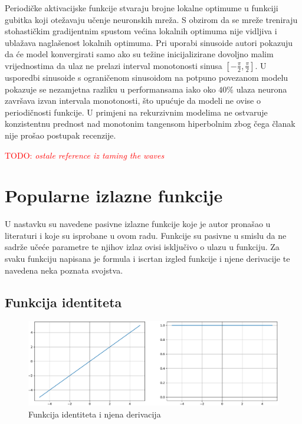 \documentclass[times, utf8, numeric, diplomski]{fer}
\def\TODO#1{\noindent\textcolor{red}{TODO: \textit{#1}}\newline}
\def\todo#1{\TODO{#1}}
\begin{document}
Periodičke aktivacijske funkcije stvaraju brojne lokalne optimume u funkciji gubitka koji otežavaju učenje neuronskih mreža. S obzirom da se mreže treniraju stohastičkim gradijentnim spustom većina lokalnih optimuma nije vidljiva i ublažava naglašenost lokalnih optimuma. Pri uporabi sinusoide autori pokazuju da će model konvergirati samo ako su težine inicijalizirane dovoljno malim vrijednostima da ulaz ne prelazi interval monotonosti sinusa $[-\frac{\pi}{2}, \frac{\pi}{2}]$. U usporedbi sinusoide s ograničenom sinusoidom na potpuno povezanom modelu pokazuje se nezamjetna razliku u performansama iako oko $40\%$ ulaza neurona završava izvan intervala monotonosti, što upućuje da modeli ne ovise o periodičnosti funkcije. U primjeni na rekurzivnim modelima ne ostvaruje konzistentnu prednost nad monotonim tangensom hiperbolnim zbog čega članak nije prošao postupak recenzije. \citep{taming_waves}

\todo{ostale reference iz taming the waves}

\section{Popularne izlazne funkcije}
U nastavku su navedene pasivne izlazne funkcije koje je autor pronašao u literaturi i koje su isprobane u ovom radu. Funkcije su pasivne u smislu da ne sadrže učeće parametre te njihov izlaz ovisi isključivo o ulazu  u funkciju. Za svaku funkciju napisana je formula i iscrtan izgled funkcije i njene derivacije te navedena neka poznata svojstva.

\subsection{Funkcija identiteta}

\begin{figure}[H]
\includegraphics[width=\textwidth]{Identity.pdf}
\centering
\caption{Funkcija identiteta i njena derivacija}
\label{fig:identity}
\end{figure}
\end{document}

